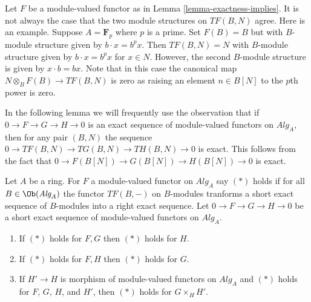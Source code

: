 \begin{example}
\label{example-module-structure-different}
Let $F$ be a module-valued functor as in
Lemma \ref{lemma-exactness-implies}.
It is not always the case that the two module structures on
$TF(B, N)$ agree. Here is an example. Suppose $A = \mathbf{F}_p$
where $p$ is a prime. Set $F(B) = B$ but with $B$-module structure
given by $b \cdot x = b^px$. Then $TF(B, N) = N$ with $B$-module structure
given by $b \cdot x = b^px$ for $x \in N$. However, the second $B$-module
structure is given by $x \cdot b = bx$. Note that in this case the canonical
map $N \otimes_B F(B) \to TF(B, N)$ is zero as raising an element
$n \in B[N]$ to the $p$th power is zero.
\end{example}

\noindent
In the following lemma we will frequently use the observation that
if $0 \to F \to G \to H \to 0$ is an exact sequence of module-valued
functors on $\textit{Alg}_A$, then for any pair $(B, N)$ the
sequence $0 \to TF(B, N) \to TG(B, N) \to TH(B, N) \to 0$ is exact.
This follows from the fact that $0 \to F(B[N]) \to G(B[N]) \to H(B[N]) \to 0$
is exact.

\begin{lemma}
\label{lemma-exactness-permanence}
Let $A$ be a ring. For $F$ a module-valued functor on $\textit{Alg}_A$
say $(*)$ holds if for all $B \in \Ob(\textit{Alg}_A)$ the
functor $TF(B, -)$ on $B$-modules tranforms a short exact sequence
of $B$-modules into a right exact sequence. Let
$0 \to F \to G \to H \to 0$ be a short exact sequence of
module-valued functors on $\textit{Alg}_A$.
\begin{enumerate}
\item If $(*)$ holds for $F, G$ then $(*)$ holds for $H$.
\item If $(*)$ holds for $F, H$ then $(*)$ holds for $G$.
\item If $H' \to H$ is morphism of module-valued functors on $\textit{Alg}_A$
and $(*)$ holds for $F$, $G$, $H$, and $H'$, then $(*)$ holds for
$G \times_H H'$.
\end{enumerate}
\end{lemma}

